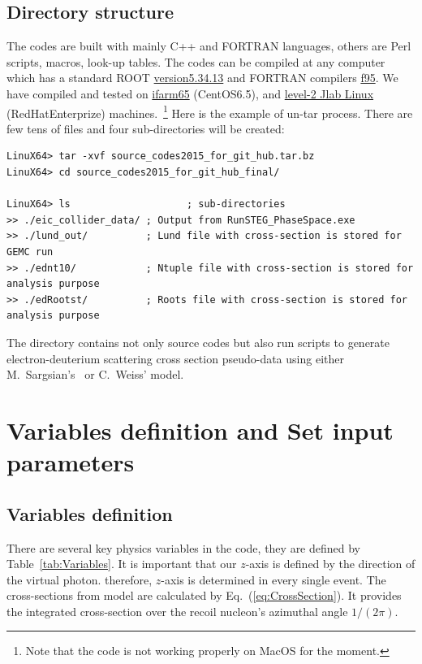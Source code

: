 \documentclass[12pt,letterpaper]{article}
\begin{document}
\subsection{Directory structure}
The codes are built with mainly C++ and FORTRAN languages, others are Perl scripts, macros, look-up tables. The codes can be compiled at any computer which has a standard ROOT \underline{version5.34.13} and FORTRAN compilers \underline{f95}. We have compiled and tested on \underline{ifarm65} (CentOS6.5), and \underline{level-2 Jlab Linux} (RedHatEnterprize) machines.~\footnote{Note that the code is not working properly on MacOS for the moment.}
Here is the example of un-tar process. There are few tens of files and four sub-directories will be created:

\fontsize{9}{9}
\begin{Verbatim}[frame=single]
LinuX64> tar -xvf source_codes2015_for_git_hub.tar.bz
LinuX64> cd source_codes2015_for_git_hub_final/

LinuX64> ls                    ; sub-directories
>> ./eic_collider_data/ ; Output from RunSTEG_PhaseSpace.exe
>> ./lund_out/          ; Lund file with cross-section is stored for GEMC run
>> ./ednt10/            ; Ntuple file with cross-section is stored for analysis purpose
>> ./edRootst/          ; Roots file with cross-section is stored for analysis purpose
\end{Verbatim}
\fontsize{12}{12}

The directory contains not only source codes but also run scripts to generate electron-deuterium scattering cross section pseudo-data using either M.~Sargsian's~\cite{MSargsian} or C.~Weiss' model. 






\section{Variables definition and Set input parameters}


\subsection{Variables definition}
There are several key physics variables in the code, they are defined by Table~\ref{tab:Variables}. It is important that our  $z$-axis is defined by the direction of the virtual photon. therefore,  $z$-axis is determined in every single event. The cross-sections from model are calculated by Eq.~(\ref{eq:CrossSection}). It provides the integrated cross-section over the recoil nucleon's azimuthal angle $1/(2\pi)$.
\end{document}
